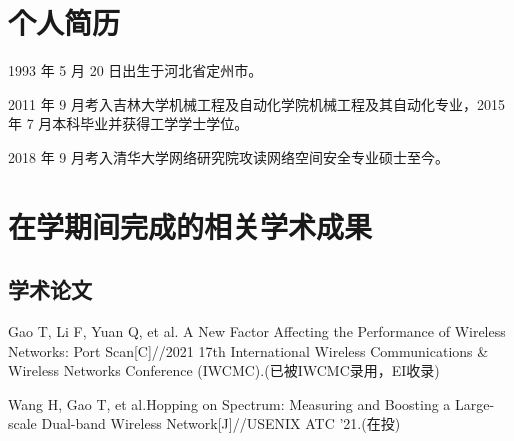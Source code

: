
\begin{resume}

  \section*{个人简历}

  1993 年 5 月 20 日出生于河北省定州市。

  2011 年 9 月考入吉林大学机械工程及自动化学院机械工程及其自动化专业，2015 年 7 月本科毕业并获得工学学士学位。

  2018 年 9 月考入清华大学网络研究院攻读网络空间安全专业硕士至今。


  \section*{在学期间完成的相关学术成果}

  \subsection*{学术论文}

  \begin{achievements}
    \item Gao T, Li F, Yuan Q, et al. A New Factor Affecting the Performance of Wireless Networks: Port Scan[C]//2021 17th International Wireless Communications \& Wireless Networks Conference (IWCMC).(已被IWCMC录用，EI收录)
    \item Wang H, Gao T, et al.Hopping on Spectrum: Measuring and Boosting a Large-scale Dual-band Wireless Network[J]//USENIX ATC '21.(在投)
  \end{achievements}




\end{resume}
